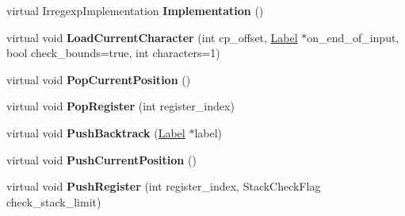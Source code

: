 \begin{DoxyCompactItemize}
\item 
virtual Irregexp\+Implementation {\bfseries Implementation} ()\hypertarget{classv8_1_1internal_1_1_reg_exp_macro_assembler_m_i_p_s_a4429da28dc2889958fcdbe7a16c6aad1}{}\label{classv8_1_1internal_1_1_reg_exp_macro_assembler_m_i_p_s_a4429da28dc2889958fcdbe7a16c6aad1}

\item 
virtual void {\bfseries Load\+Current\+Character} (int cp\+\_\+offset, \hyperlink{classv8_1_1internal_1_1_label}{Label} $\ast$on\+\_\+end\+\_\+of\+\_\+input, bool check\+\_\+bounds=true, int characters=1)\hypertarget{classv8_1_1internal_1_1_reg_exp_macro_assembler_m_i_p_s_a2d190fef5eed04167abaa06f39260b7b}{}\label{classv8_1_1internal_1_1_reg_exp_macro_assembler_m_i_p_s_a2d190fef5eed04167abaa06f39260b7b}

\item 
virtual void {\bfseries Pop\+Current\+Position} ()\hypertarget{classv8_1_1internal_1_1_reg_exp_macro_assembler_m_i_p_s_af32978ed86c8ffcd05211361d28258cf}{}\label{classv8_1_1internal_1_1_reg_exp_macro_assembler_m_i_p_s_af32978ed86c8ffcd05211361d28258cf}

\item 
virtual void {\bfseries Pop\+Register} (int register\+\_\+index)\hypertarget{classv8_1_1internal_1_1_reg_exp_macro_assembler_m_i_p_s_aa1f3f5de6dd96aae2d1005fca9536221}{}\label{classv8_1_1internal_1_1_reg_exp_macro_assembler_m_i_p_s_aa1f3f5de6dd96aae2d1005fca9536221}

\item 
virtual void {\bfseries Push\+Backtrack} (\hyperlink{classv8_1_1internal_1_1_label}{Label} $\ast$label)\hypertarget{classv8_1_1internal_1_1_reg_exp_macro_assembler_m_i_p_s_abe748d8834dd7a487ed3e84a30f97d7d}{}\label{classv8_1_1internal_1_1_reg_exp_macro_assembler_m_i_p_s_abe748d8834dd7a487ed3e84a30f97d7d}

\item 
virtual void {\bfseries Push\+Current\+Position} ()\hypertarget{classv8_1_1internal_1_1_reg_exp_macro_assembler_m_i_p_s_a1d439ae74fdb89088f9b96d2d88f1559}{}\label{classv8_1_1internal_1_1_reg_exp_macro_assembler_m_i_p_s_a1d439ae74fdb89088f9b96d2d88f1559}

\item 
virtual void {\bfseries Push\+Register} (int register\+\_\+index, Stack\+Check\+Flag check\+\_\+stack\+\_\+limit)\hypertarget{classv8_1_1internal_1_1_reg_exp_macro_assembler_m_i_p_s_a90366ef0b90e87e3abeadd215ac99101}{}\label{classv8_1_1internal_1_1_reg_exp_macro_assembler_m_i_p_s_a90366ef0b90e87e3abeadd215ac99101}


\end{DoxyCompactItemize}
